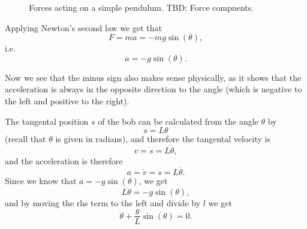 \begin{figure}
	\begin{center}
	\end{center}
	\caption{Forces acting on a simple pendulum. TBD: Force compnents.}
	\label{fig:simple_pendulum_forces}
\end{figure}

Applying Newton's second law we get that
\begin{equation}
	F = ma = -mg\sin(\theta),
	\label{eq:simple_pendulum_newton_second_law}
\end{equation}
i.e.
\begin{equation}
	a = -g\sin(\theta).
	\label{eq:simple_pendulum_acceleration}
\end{equation}

Now we see that the minus sign also makes sense physically, as it shows that the acceleration is always in the opposite direction to the angle (which is negative to the left and positive to the right).

The tangental position $s$ of the bob can be calculated from the angle $\theta$ by
\begin{equation}
	s = L\theta
	\label{eq:simple_pendulum_tangental_position}
\end{equation}
(recall that $\theta$ is given in radians), and therefore the tangental velocity is
\begin{equation}
	v = \dot{s} = L\dot{\theta},
	\label{eq:simple_pendulum_tangental_velovity}
\end{equation}
and the acceleration is therefore
\begin{equation}
	a = \dot{v} = \ddot{s} = L\ddot{\theta}.
	\label{eq:simple_pendulum_tangental_acceleration}
\end{equation}
Since we know that $a=-g\sin(\theta)$, we get
\begin{equation}
	L\ddot{\theta} = -g\sin(\theta),
\end{equation}
and by moving the rhs term to the left and divide by $l$ we get
\begin{equation}
	\ddot{\theta} + \frac{g}{L}\sin(\theta) = 0.
	\label{eq:simple_pendulum_differential_equation}
\end{equation}

